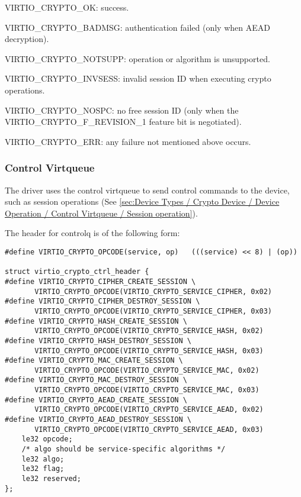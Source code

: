 \begin{itemize*}
\item VIRTIO_CRYPTO_OK: success.
\item VIRTIO_CRYPTO_BADMSG: authentication failed (only when AEAD decryption).
\item VIRTIO_CRYPTO_NOTSUPP: operation or algorithm is unsupported.
\item VIRTIO_CRYPTO_INVSESS: invalid session ID when executing crypto operations.
\item VIRTIO_CRYPTO_NOSPC: no free session ID (only when the VIRTIO_CRYPTO_F_REVISION_1
    feature bit is negotiated).
\item VIRTIO_CRYPTO_ERR: any failure not mentioned above occurs.
\end{itemize*}

\subsubsection{Control Virtqueue}\label{sec:Device Types / Crypto Device / Device Operation / Control Virtqueue}

The driver uses the control virtqueue to send control commands to the
device, such as session operations (See \ref{sec:Device Types / Crypto Device / Device
Operation / Control Virtqueue / Session operation}).

The header for controlq is of the following form:
\begin{lstlisting}
#define VIRTIO_CRYPTO_OPCODE(service, op)   (((service) << 8) | (op))

struct virtio_crypto_ctrl_header {
#define VIRTIO_CRYPTO_CIPHER_CREATE_SESSION \
       VIRTIO_CRYPTO_OPCODE(VIRTIO_CRYPTO_SERVICE_CIPHER, 0x02)
#define VIRTIO_CRYPTO_CIPHER_DESTROY_SESSION \
       VIRTIO_CRYPTO_OPCODE(VIRTIO_CRYPTO_SERVICE_CIPHER, 0x03)
#define VIRTIO_CRYPTO_HASH_CREATE_SESSION \
       VIRTIO_CRYPTO_OPCODE(VIRTIO_CRYPTO_SERVICE_HASH, 0x02)
#define VIRTIO_CRYPTO_HASH_DESTROY_SESSION \
       VIRTIO_CRYPTO_OPCODE(VIRTIO_CRYPTO_SERVICE_HASH, 0x03)
#define VIRTIO_CRYPTO_MAC_CREATE_SESSION \
       VIRTIO_CRYPTO_OPCODE(VIRTIO_CRYPTO_SERVICE_MAC, 0x02)
#define VIRTIO_CRYPTO_MAC_DESTROY_SESSION \
       VIRTIO_CRYPTO_OPCODE(VIRTIO_CRYPTO_SERVICE_MAC, 0x03)
#define VIRTIO_CRYPTO_AEAD_CREATE_SESSION \
       VIRTIO_CRYPTO_OPCODE(VIRTIO_CRYPTO_SERVICE_AEAD, 0x02)
#define VIRTIO_CRYPTO_AEAD_DESTROY_SESSION \
       VIRTIO_CRYPTO_OPCODE(VIRTIO_CRYPTO_SERVICE_AEAD, 0x03)
    le32 opcode;
    /* algo should be service-specific algorithms */
    le32 algo;
    le32 flag;
    le32 reserved;
};
\end{lstlisting}

